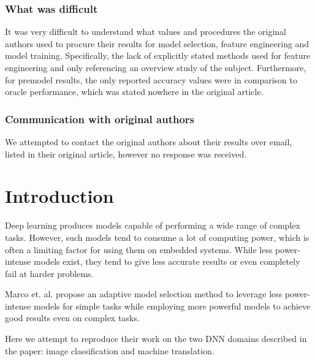 \subsubsection{What was difficult}
It was very difficult to understand what values and procedures the original authors used to procure their results for model selection, feature engineering and model training. Specifically, the lack of explicitly stated methods used for feature engineering and only referencing an overview study of the subject. Furthermore, for premodel results, the only reported accuracy values were in comparison to oracle performance, which was stated nowhere in the original article. 

\subsubsection{Communication with original authors}
We attempted to contact the original authors about their results over email, listed in their original article, however no response was received.



\section{Introduction}
Deep learning produces models capable of performing a wide range of complex tasks. However, such models tend to consume a lot of computing power, which is often a limiting factor for using them on embedded systems. While less power-intense models exist, they tend to give less accurate results or even completely fail at harder problems.

Marco et. al. \cite{marco2019optimizing} propose an adaptive model selection method to leverage less power-intense models for simple tasks while employing more powerful models to achieve good results even on complex tasks.

Here we attempt to reproduce their work on the two DNN domains described in the paper: image classification and machine translation.

